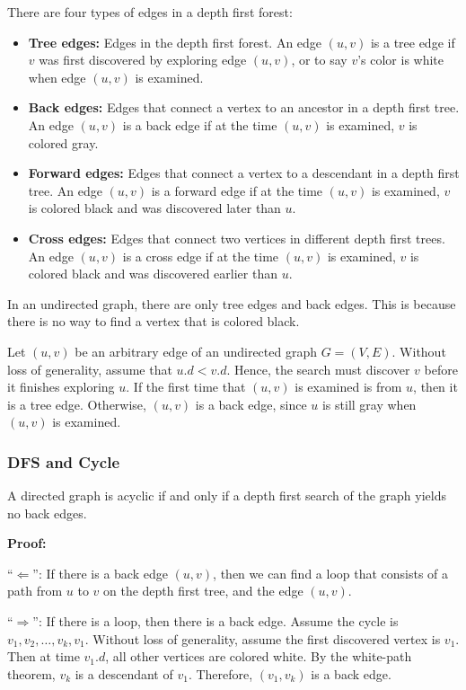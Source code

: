 \documentclass[a4paper,12pt]{article}
\begin{document}
There are four types of edges in a depth first forest:
\begin{itemize}
	\item \textbf{Tree edges:}
	Edges in the depth first forest.
	An edge $(u, v)$ is a tree edge if $v$ was first discovered by exploring edge $(u, v)$, or to say $v$'s color is white when edge $(u, v)$ is examined.
	\item \textbf{Back edges:}
	Edges that connect a vertex to an ancestor in a depth first tree.
	An edge $(u, v)$ is a back edge if at the time $(u, v)$ is examined, $v$ is colored gray.
	\item \textbf{Forward edges:}
	Edges that connect a vertex to a descendant in a depth first tree.
	An edge $(u, v)$ is a forward edge if at the time $(u, v)$ is examined, $v$ is colored black and was discovered later than $u$.
	\item \textbf{Cross edges:}
	Edges that connect two vertices in different depth first trees.
	An edge $(u, v)$ is a cross edge if at the time $(u, v)$ is examined, $v$ is colored black and was discovered earlier than $u$.
\end{itemize}

In an undirected graph, there are only tree edges and back edges.
This is because there is no way to find a vertex that is colored black.

Let $(u,v)$ be an arbitrary edge of an undirected graph $G = (V, E)$.
Without loss of generality, assume that $u.d < v.d$.
Hence, the search must discover $v$ before it finishes exploring $u$.
If the first time that $(u, v)$ is examined is from $u$, then it is a tree edge.
Otherwise, $(u, v)$ is a back edge, since $u$ is still gray when $(u, v)$ is examined.

\subsubsection{DFS and Cycle}

A directed graph is acyclic if and only if a depth first search of the graph yields no back edges.

\textbf{Proof:}

``$\Leftarrow$'':
If there is a back edge $(u, v)$, then we can find a loop that consists of a path from $u$ to $v$ on the depth first tree, and the edge $(u, v)$.

``$\Rightarrow$'':
If there is a loop, then there is a back edge.
Assume the cycle is $v_1, v_2, \dots, v_k, v_1$.
Without loss of generality, assume the first discovered vertex is $v_1$.
Then at time $v_1.d$, all other vertices are colored white.
By the white-path theorem, $v_k$ is a descendant of $v_1$.
Therefore, $(v_1, v_k)$ is a back edge.
\end{document}
